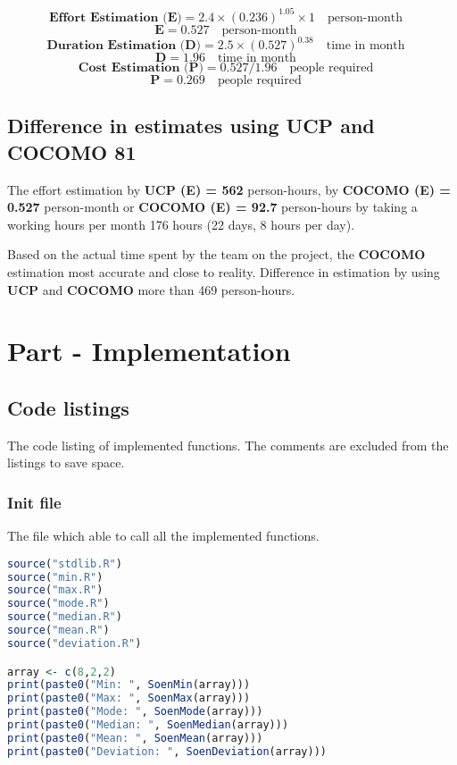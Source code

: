\documentclass[12pt]{article}
\begin{document}
\begin{equation}
    \textbf{Effort Estimation (E)} = 2.4\times (0.236)^{1.05}\times 1 \quad \textrm{person-month} \quad
\end{equation}
\begin{equation}
    \textbf{E} = 0.527 \quad \textrm{person-month} \quad
\end{equation}
\begin{equation}
    \textbf{Duration Estimation (D)} = 2.5\times (0.527)^{0.38} \quad \textrm{time in month} \quad
\end{equation}
\begin{equation}
    \textbf{D} = 1.96 \quad \textrm{time in month} \quad
\end{equation}
\begin{equation}
    \textbf{Cost Estimation (P)} = 0.527/1.96 \quad \textrm{people required} \quad
\end{equation}
\begin{equation}
    \textbf{P} = 0.269 \quad \textrm{people required} \quad
\end{equation}

\subsection{Difference in estimates using UCP and COCOMO 81}
The effort estimation by \textbf{UCP (E) = 562} person-hours, by \textbf{COCOMO (E) = 0.527} person-month or \textbf{COCOMO (E) = 92.7} person-hours by taking a working hours per month 176 hours (22 days, 8 hours per day).

Based on the actual time spent by the team on the project, the \textbf{COCOMO} estimation most accurate and close to reality. Difference in estimation by using \textbf{UCP} and \textbf{COCOMO} more than 469 person-hours.
\newpage
\section{Part - Implementation}
\subsection{Code listings}
The code listing of implemented functions. The comments are excluded from the listings to save space. 
\subsubsection{Init file}
The file which able to call all the implemented functions.
\begin{lstlisting}[language=R]
source("stdlib.R")
source("min.R")
source("max.R")
source("mode.R")
source("median.R")
source("mean.R")
source("deviation.R")

array <- c(8,2,2)
print(paste0("Min: ", SoenMin(array)))
print(paste0("Max: ", SoenMax(array)))
print(paste0("Mode: ", SoenMode(array)))
print(paste0("Median: ", SoenMedian(array)))
print(paste0("Mean: ", SoenMean(array)))
print(paste0("Deviation: ", SoenDeviation(array)))
\end{lstlisting}
\end{document}
